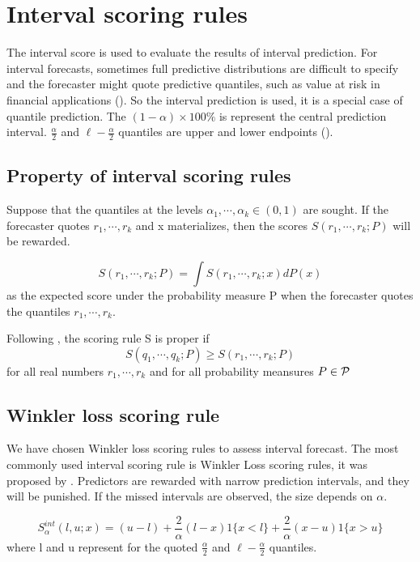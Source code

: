 \documentclass{monashthesis}
\theoremstyle{definition}
\theoremstyle{definition}
\theoremstyle{definition}
\theoremstyle{remark}
\begin{document}
\section{Interval scoring rules}\label{interval-scoring-rules}

The interval score is used to evaluate the results of interval
prediction. For interval forecasts, sometimes full predictive
distributions are difficult to specify and the forecaster might quote
predictive quantiles, such as value at risk in financial applications
(\textcite{GR07}). So the interval prediction is used, it is a special
case of quantile prediction. The \((1-\alpha)\times100\%\) is represent
the central prediction interval. \(\frac{\alpha}{2}\) and
\(\ell-\frac{\alpha}{2}\) quantiles are upper and lower endpoints
(\textcite{GBR07}).

\subsection{Property of interval scoring
rules}\label{property-of-interval-scoring-rules}

Suppose that the quantiles at the levels
\(\alpha_1,\cdots,\alpha_k\in(0,1)\) are sought. If the forecaster
quotes \(r_1,\cdots,r_k\) and x materializes, then the scores
\(S(r_1,\cdots,r_k;P)\) will be rewarded.

\[S(r_1,\cdots,r_k;P)=\int{S(r_1,\cdots,r_k;x)dP(x)}\] as the expected
score under the probability measure P when the forecaster quotes the
quantiles \(r_1,\cdots,r_k\).

Following \textcite{CM96}, the scoring rule S is proper if
\[S(q_1,\cdots,q_k;P)\geq S(r_1,\cdots,r_k;P)\] for all real numbers
\(r_1,\cdots,r_k\) and for all probability meansures \(P\in\cal{P}\)

\subsection{Winkler loss scoring rule}\label{winkler-loss-scoring-rule}

We have chosen Winkler loss scoring rules to assess interval forecast.
The most commonly used interval scoring rule is Winkler Loss scoring
rules, it was proposed by \textcite{W72}. Predictors are rewarded with
narrow prediction intervals, and they will be punished. If the missed
intervals are observed, the size depends on \(\alpha\).

\[
  S_\alpha^{int}(l,u;x)=(u-l)+\frac{2}{\alpha}(l-x)1\{x<l\}+\frac{2}{\alpha}(x-u)1\{x>u\}
\] where l and u represent for the quoted \(\frac{\alpha}{2}\) and
\(\ell-\frac{\alpha}{2}\) quantiles.
\end{document}
